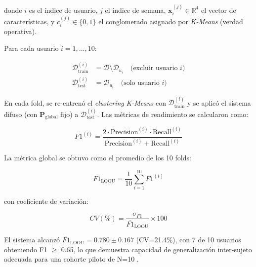 donde \(i\) es el índice de usuario, \(j\) el índice de semana, \(\mathbf{x}_i^{(j)} \in \mathbb{R}^4\) el vector de características, y \(c_i^{(j)} \in \{0, 1\}\) el conglomerado asignado por \textit{K-Means} (verdad operativa).

Para cada usuario \(i = 1, \ldots, 10\):

\begin{align}
\mathcal{D}_{\text{train}}^{(i)} &= \mathcal{D} \setminus \mathcal{D}_{u_i} \quad \text{(excluir usuario } i\text{)} \label{eq:loou_train} \\
\mathcal{D}_{\text{test}}^{(i)} &= \mathcal{D}_{u_i} \quad \text{(solo usuario } i\text{)} \label{eq:loou_test}
\end{align}

En cada fold, se re-entrenó el \textit{clustering} \textit{K-Means} con \(\mathcal{D}_{\text{train}}^{(i)}\) y se aplicó el sistema difuso (con \(\mathbf{P}_{\text{global}}\) fijo) a \(\mathcal{D}_{\text{test}}^{(i)}\). Las métricas de rendimiento se calcularon como:

\begin{equation}
F1^{(i)} = \frac{2 \cdot \text{Precision}^{(i)} \cdot \text{Recall}^{(i)}}{\text{Precision}^{(i)} + \text{Recall}^{(i)}}
\label{eq:f1_fold}
\end{equation}

La métrica global se obtuvo como el promedio de los 10 folds:

\begin{equation}
\overline{F1}_{\text{LOOU}} = \frac{1}{10} \sum_{i=1}^{10} F1^{(i)}
\label{eq:f1_loou_global}
\end{equation}

con coeficiente de variación:

\begin{equation}
CV(\%) = \frac{\sigma_{F1}}{\overline{F1}_{\text{LOOU}}} \times 100
\label{eq:cv_loou}
\end{equation}

El sistema alcanzó \(\overline{F1}_{\text{LOOU}} = 0.780 \pm 0.167\) (CV=21.4\%), con 7 de 10 usuarios obteniendo F1 \(\geq\) 0.65, lo que demuestra capacidad de generalización inter-sujeto adecuada para una cohorte piloto de N=10 \cite{Alinia2020}.


